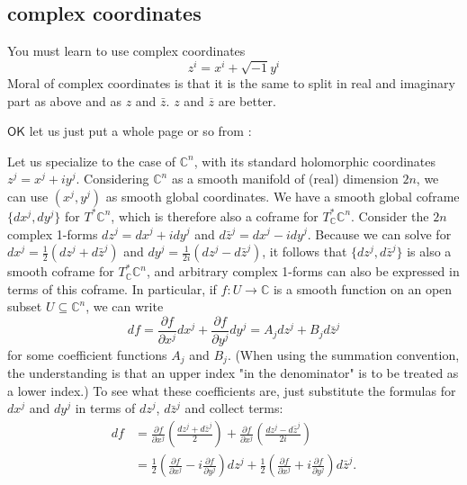\subsection{complex coordinates}

You must learn to use complex coordinates
\[z^i=x^i+\sqrt{-1}y^i \]
Moral of complex coordinates is that it is the same to split in real and imaginary part as above and as \(z\) and \(\bar{z} \). \(z\) and \(\overline{z}\) are better.

\(\mathsf{OK}\) let us just put a whole page or so from \cite{lec}:

Let us specialize to the case of $\mathbb{C}^n$, with its standard holomorphic coordinates $z^j = x^j + i y^j$. Considering $\mathbb{C}^n$ as a smooth manifold of (real) dimension $2n$, we can use $(x^j,y^j)$ as smooth global coordinates. We have a smooth global coframe $\{dx^j, dy^j\}$ for $T^*\mathbb{C}^n$, which is therefore also a coframe for $T^*_\mathbb{C}\mathbb{C}^n$. Consider the $2n$ complex 1-forms $dz^j = dx^j + i dy^j$ and $d\bar{z}^j = dx^j - i dy^j$. Because we can solve for $dx^j = \frac{1}{2}(dz^j+d\bar{z}^j)$ and $dy^j = \frac{1}{2i}(dz^j - d\bar{z}^j)$, it follows that $\{dz^j, d\bar{z}^j\}$ is also a smooth coframe for $T^*_\mathbb{C}\mathbb{C}^n$, and arbitrary complex 1-forms can also be expressed in terms of this coframe. In particular, if $f : U \to \mathbb{C}$ is a smooth function on an open subset $U \subseteq \mathbb{C}^n$, we can write
\[
  df = \frac{\partial f}{\partial x^j} dx^j + \frac{\partial f}{\partial y^j} dy^j = A_j dz^j + B_j d\bar{z}^j
\]
for some coefficient functions $A_j$ and $B_j$. (When using the summation convention, the understanding is that an upper index "in the denominator" is to be treated as a lower index.) To see what these coefficients are, just substitute the formulas for $dx^j$ and $dy^j$ in terms of $dz^j$, $d\bar{z}^j$ and collect terms:
\begin{equation}\label{eq:local}\begin{aligned}
  df &= \frac{\partial f}{\partial x^j}\left(\frac{dz^j + d\bar{z}^j}{2}\right) + \frac{\partial f}{\partial x^j}\left(\frac{dz^j - d\bar{z}^j}{2i}\right) \nonumber\\[8pt]
  &= \frac{1}{2}\left(\frac{\partial f}{\partial x^j} - i\frac{\partial f}{\partial y^j}\right)dz^j + \frac{1}{2}\left(\frac{\partial f}{\partial x^j} + i\frac{\partial f}{\partial y^j}\right)d\bar{z}^j.
\end{aligned}\end{equation}

